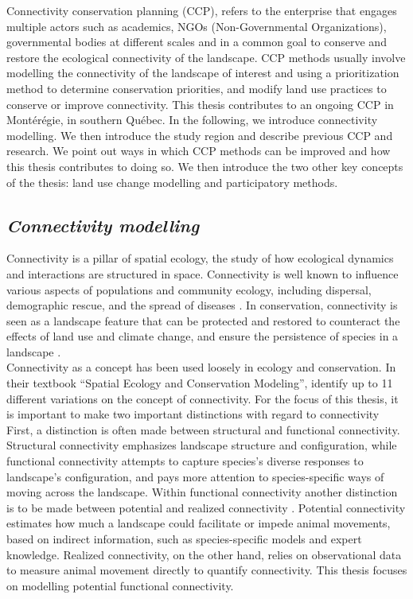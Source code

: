 \documentclass[12pt,Bold,TexShade]{thesis/mcgilletdclass}
\begin{document}
{Connectivity conservation planning (CCP), refers to the enterprise that engages multiple actors such as academics, NGOs (Non-Governmental Organizations), governmental bodies at different scales and in a common goal to conserve and restore the ecological connectivity of the landscape. CCP methods usually involve modelling the connectivity of the landscape of interest and using a prioritization method to determine conservation priorities, and modify land use practices to conserve or improve connectivity. This thesis  contributes to an ongoing CCP in Montérégie, in southern Québec. In the following, we introduce connectivity modelling. We then introduce the study region and describe previous CCP and research. We point out ways in which CCP methods can be improved and how this thesis contributes to doing so. We then introduce the two other key concepts of the thesis: land use change modelling and participatory methods. \\ \vspace{2em}

\subsection*{\textit{Connectivity modelling \\ \vspace{1em}}}

Connectivity is a pillar of spatial ecology, the study of how ecological dynamics and interactions are structured in space. Connectivity is well known to influence various aspects of populations and community ecology, including dispersal, demographic rescue, and the spread of diseases \citep{krosby_ecological_2010, crook_human_2015}. In conservation, connectivity is seen as a landscape feature that can be protected and restored to counteract the effects of  land use and climate change, and ensure the persistence of species in a landscape \citep{costanza_landscape_2019}. \\

Connectivity as a concept has been used loosely in ecology and conservation. In their textbook “Spatial Ecology and Conservation Modeling”, \cite{fletcher_spatial_2018} identify up to 11 different variations on the concept of connectivity. For the focus of this thesis, it is important to make two important distinctions with regard to connectivity First, a distinction is often made between structural and functional connectivity. Structural connectivity emphasizes landscape structure and configuration, while functional connectivity attempts to capture species’s diverse responses to landscape’s configuration, and pays more attention to species-specific ways of moving across the landscape. Within functional connectivity another distinction is to be made between potential and realized connectivity \citep{calabrese_comparison_2004}. Potential connectivity estimates how much a landscape could facilitate or impede animal movements, based on indirect information, such as species-specific models and expert knowledge. Realized connectivity, on the other hand, relies on observational data to measure animal movement directly to quantify connectivity. This thesis focuses on modelling potential functional connectivity. \\

}
\end{document}
